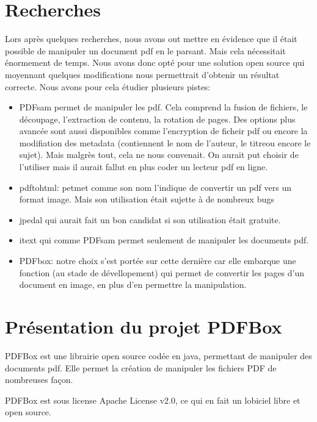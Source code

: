   \section{Recherches}
    Lors après quelques recherches, nous avons out mettre en évidence que il était 
    possible de manipuler un document pdf en le parsant. Mais cela nécessitait 
    énormement de temps. Nous avons donc opté pour une solution open source
    qui moyennant quelques modifications nous permettrait d'obtenir un résultat
    correcte.
    Nous avons pour cela étudier plusieurs pistes:
    \begin{itemize}
    \item PDFsam permet de manipuler les pdf. Cela comprend la fusion de 
     fichiers, le découpage, l'extraction de contenu, la rotation de pages.
     Des options plus avancée sont aussi disponibles comme l'encryption de ficheir
     pdf ou encore  la modifiation des metadata (contiennent le nom de l'auteur,
     le titreou encore le sujet). Mais malgrès tout, cela ne nous convenait.
     On aurait put choisir de l'utiliser mais il aurait fallut en plus coder un lecteur 
     pdf en ligne.
     \item pdftohtml: petmet comme son nom l'indique de convertir un pdf 
     vers un format image. Mais son utilisation était sujette à de nombreux bugs
     \item jpedal qui aurait fait un bon candidat si son utilisation était gratuite.
     \item itext qui comme PDFsam permet seulement de manipuler les 
     documents pdf.
     \item PDFbox: notre choix s'est portée sur cette dernière car elle embarque une 
     fonction (au stade de dévellopement) qui permet de convertir les pages d'un
     document en image, en plus d'en permettre la manipulation.
    \end{itemize}

    \section{Présentation du projet PDFBox}
    PDFBox est une librairie open source codée en java, permettant de manipuler 
    des documents pdf. Elle permet la création de manipuler les fichiers PDF de 
    nombreuses façon.

    PDFBox est sous license Apache License v2.0, ce qui en fait un lobiciel libre 
    et open source.

